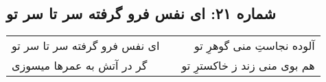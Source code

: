 \begin{center}
\section*{شماره ۲۱: ای نفس فرو گرفته سر تا سر تو}
\label{sec:021}
\begin{longtable}{l p{0.5cm} r}
ای نفس فرو گرفته سر تا سر تو
&&
آلوده نجاستِ منی گوهرِ تو
\\
گر در آتش به عمرها میسوزی
&&
هم بوی منی زند ز خاکسترِ تو
\\
\end{longtable}
\end{center}

